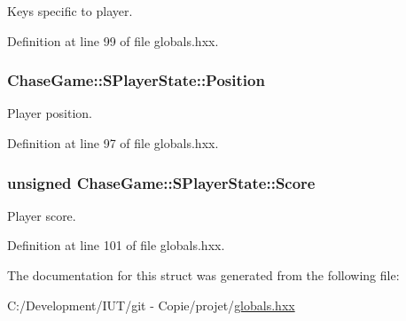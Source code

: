 Keys specific to player. 



Definition at line 99 of file globals.\-hxx.

\hypertarget{struct_chase_game_1_1_s_player_state_a0a68b95a4255f2a543675f88b00847b4}{
\subsubsection[{Position}]{ Chase\-Game\-::\-S\-Player\-State\-::\-Position}}\label{struct_chase_game_1_1_s_player_state_a0a68b95a4255f2a543675f88b00847b4}


Player position. 



Definition at line 97 of file globals.\-hxx.

\hypertarget{struct_chase_game_1_1_s_player_state_a268594c795a70cf1eb9fe6061bfa57d0}{
\subsubsection[{Score}]{\setlength{\rightskip}{0pt plus 5cm}unsigned Chase\-Game\-::\-S\-Player\-State\-::\-Score}}\label{struct_chase_game_1_1_s_player_state_a268594c795a70cf1eb9fe6061bfa57d0}


Player score. 



Definition at line 101 of file globals.\-hxx.



The documentation for this struct was generated from the following file\-:\begin{DoxyCompactItemize}
\item 
C\-:/\-Development/\-I\-U\-T/git -\/ Copie/projet/\hyperlink{globals_8hxx}{globals.\-hxx}\end{DoxyCompactItemize}
